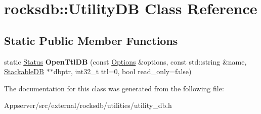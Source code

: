 \hypertarget{classrocksdb_1_1UtilityDB}{}\section{rocksdb\+:\+:Utility\+DB Class Reference}
\label{classrocksdb_1_1UtilityDB}
\subsection*{Static Public Member Functions}
\begin{DoxyCompactItemize}
\item 
static \hyperlink{classrocksdb_1_1Status}{Status} {\bfseries Open\+Ttl\+DB} (const \hyperlink{structrocksdb_1_1Options}{Options} \&options, const std\+::string \&name, \hyperlink{classrocksdb_1_1StackableDB}{Stackable\+DB} $\ast$$\ast$dbptr, int32\+\_\+t ttl=0, bool read\+\_\+only=false)\hypertarget{classrocksdb_1_1UtilityDB_a368929b924620d34b634b1a53f5a730a}{}\label{classrocksdb_1_1UtilityDB_a368929b924620d34b634b1a53f5a730a}

\end{DoxyCompactItemize}


The documentation for this class was generated from the following file\+:\begin{DoxyCompactItemize}
\item 
Appserver/src/external/rocksdb/utilities/utility\+\_\+db.\+h\end{DoxyCompactItemize}

